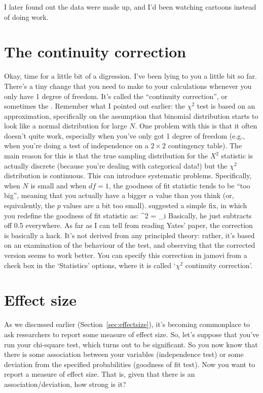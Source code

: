 
I later found out the data were made up, and I'd been watching cartoons instead of doing work.
\vspace*{12pt}


\section{The continuity correction~\label{sec:yates}}

Okay, time for a little bit of a digression. I've been lying to you a little bit so far. There's a tiny change that you need to make to your calculations whenever you only have 1 degree of freedom. It's called the ``continuity correction'', or sometimes the . Remember what I pointed out earlier: the $\chi^2$ test is based on an approximation, specifically on the assumption that binomial distribution starts to look like a normal distribution for large $N$. One problem with this is that it often doesn't quite work, especially when you've only got 1 degree of freedom (e.g., when you're doing a test of independence on a $2 \times 2$ contingency table). The main reason for this is that the true sampling distribution for the $X^2$ statistic is actually discrete (because you're dealing with categorical data!) but the $\chi^2$ distribution is continuous. This can introduce systematic problems. Specifically, when $N$ is small and when $df=1$, the goodness of fit statistic tends to be ``too big'', meaning that you actually have a bigger $\alpha$ value than you think (or, equivalently, the $p$ values are a bit too small). \textcite{Yates1934} suggested a simple fix, in which you redefine the goodness of fit statistic as:
\be
\chi^2 = \sum_{i} 
\ee
Basically, he just subtracts off 0.5 everywhere. As far as I can tell from reading Yates' paper, the correction is basically a hack. It's not derived from any principled theory: rather, it's based on an examination of the behaviour of the test, and observing that the corrected version seems to work better. You can specify this correction in jamovi from a check box in the `Statistics' options, where it is called `$\chi^2$ continuity correction'. 


\section{Effect size~\label{sec:chisqeffectsize}}

As we discussed earlier (Section~\ref{sec:effectsize}), it's becoming commonplace to ask researchers to report some measure of effect size. So, let's suppose that you've run your chi-square test, which turns out to be significant. So you now know that there is some association between your variables (independence test) or some deviation from the specified probabilities (goodness of fit test). Now you want to report a measure of effect size. That is, given that there is an association/deviation, how strong is it?


